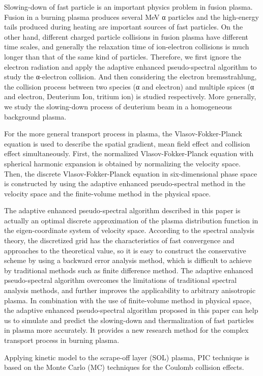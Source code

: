 \begin{abstract*}
Slowing-down of fast particle is an important physics problem in fusion plasma. Fusion in a burning plasma produces several MeV α particles and the high-energy tails produced during heating are important sources of fast particles. On the other hand, different charged particle collisions in fusion plasma have different time scales, and generally the relaxation time of ion-electron collisions is much longer than that of the same kind of particles. Therefore, we first ignore the electron radiation and apply the adaptive enhanced pseudo-spectral algorithm to study the α-electron collision. And then considering the electron bremsstrahlung, the collision process between two species (α and electron) and multiple spices (α and electron, Deuterium Ion, tritium ion) is studied respectively. More generally, we study the slowing-down process of deuterium beam in a homogeneous background plasma.

For the more general transport process in plasma, the Vlasov-Fokker-Planck equation is used to describe the spatial gradient, mean field effect and collision effect simultaneously. First, the normalized Vlasov-Fokker-Planck equation with spherical harmonic expansion is obtained by normalizing the velocity space. Then, the discrete Vlasov-Fokker-Planck equation in six-dimensional phase space is constructed by using the adaptive enhanced pseudo-spectral method in the velocity space and the finite-volume method in the physical space.

The adaptive enhanced pseudo-spectral algorithm described in this paper is actually an optimal discrete approximation of the plasma distribution function in the eigen-coordinate system of velocity space. According to the spectral analysis theory, the discretized grid has the characteristics of fast convergence and approaches to the theoretical value, so it is easy to construct the conservative scheme by using a backward error analysis method, which is difficult to achieve by traditional methods such as finite difference method. The adaptive enhanced pseudo-spectral algorithm overcomes the limitations of traditional spectral analysis methods, and further improves the applicability to arbitrary anisotropic plasma. In combination with the use of finite-volume method in physical space, the adaptive enhanced pseudo-spectral algorithm proposed in this paper can help us to simulate and predict the slowing-down and thermalization of fast particles in plasma more accurately. It provides a new research method for the complex transport process in burning plasma.

Applying kinetic model to the scrape-off layer (SOL) plasma, PIC technique is based on the Monte Carlo (MC) techniques for the Coulomb collision effects\cite{Procassini1990}. 

\end{abstract*}
